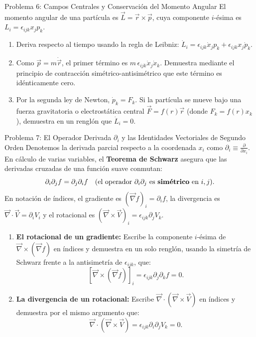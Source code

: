 \documentclass[11pt,letterpaper]{article}
\begin{document}
\begin{infobox}{Problema 6: Campos Centrales y Conservación del Momento Angular}
El momento angular de una partícula es $\vec{L} = \vec{r} \times \vec{p}$, cuya componente $i$-ésima es $L_i = \epsilon_{ijk} x_j p_k$.
\begin{enumerate}[label=(\alph*)]
    \item Deriva respecto al tiempo usando la regla de Leibniz: $\dot{L}_i = \epsilon_{ijk} \dot{x}_j p_k + \epsilon_{ijk} x_j \dot{p}_k$.
    \item Como $\vec{p} = m\dot{\vec{r}}$, el primer término es $m\,\epsilon_{ijk} \dot{x}_j \dot{x}_k$. Demuestra mediante el principio de contracción simétrico-antisimétrico que este término es idénticamente cero.
    \item Por la segunda ley de Newton, $\dot{p}_k = F_k$. Si la partícula se mueve bajo una fuerza gravitatoria o electrostática central $\vec{F} = f(r)\vec{r}$ (donde $F_k = f(r)x_k$), demuestra en un renglón que $\dot{L}_i = 0$.
\end{enumerate}
\end{infobox}

\begin{infobox}{Problema 7: El Operador Derivada $\partial_i$ y las Identidades Vectoriales de Segundo Orden}
Denotemos la derivada parcial respecto a la coordenada $x_i$ como $\partial_i \equiv \frac{\partial}{\partial x_i}$. En cálculo de varias variables, el \textbf{Teorema de Schwarz} asegura que las derivadas cruzadas de una función suave conmutan:
\[
\partial_i \partial_j f = \partial_j \partial_i f \quad (\text{el operador } \partial_i \partial_j \text{ es \textbf{simétrico} en } i, j).
\]
En notación de índices, el gradiente es $(\vec{\nabla}f)_i = \partial_i f$, la divergencia es $\vec{\nabla}\cdot\vec{V} = \partial_i V_i$ y el rotacional es $(\vec{\nabla}\times\vec{V})_i = \epsilon_{ijk} \partial_j V_k$.
\begin{enumerate}[label=(\alph*)]
    \item \textbf{El rotacional de un gradiente:} Escribe la componente $i$-ésima de $\vec{\nabla} \times (\vec{\nabla}f)$ en índices y demuestra en un solo renglón, usando la simetría de Schwarz frente a la antisimetría de $\epsilon_{ijk}$, que:
    \[
    [\vec{\nabla} \times (\vec{\nabla}f)]_i = \epsilon_{ijk} \partial_j \partial_k f = 0.
    \]
    \item \textbf{La divergencia de un rotacional:} Escribe $\vec{\nabla} \cdot (\vec{\nabla} \times \vec{V})$ en índices y demuestra por el mismo argumento que:
    \[
    \vec{\nabla} \cdot (\vec{\nabla} \times \vec{V}) = \epsilon_{ijk} \partial_i \partial_j V_k = 0.
    \]
\end{enumerate}
\end{infobox}
\end{document}
